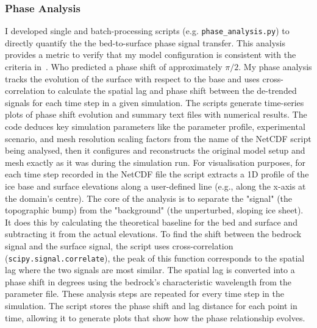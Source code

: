 \subsubsection{Phase Analysis}
I developed single and batch-processing scripts (e.g. \texttt{phase\_analysis.py}) to directly quantify the the bed-to-surface phase signal transfer. This analysis provides a metric to verify that my model configuration is consistent with the criteria in~\cite{Budd_1970}. Who predicted a phase shift of approximately $\pi / 2$. 
My phase analysis tracks the evolution of the surface with respect to the base and uses cross-correlation to calculate the spatial lag and phase shift between the de-trended signals for each time step in a given simulation.
The scripts generate time-series plots of phase shift evolution and summary text files with numerical results. The code deduces key simulation parameters like the parameter profile, experimental scenario, and mesh resolution scaling factors from the name of the NetCDF script being analysed, then it configures and reconstructs the original model setup and mesh exactly as it was during the simulation run. For visualisation purposes, for each time step recorded in the NetCDF file the script extracts a 1D profile of the ice base and surface elevations along a user-defined line (e.g., along the x-axis at the domain's centre). The core of the analysis is to separate the "signal" (the topographic bump) from the "background" (the unperturbed, sloping ice sheet). It does this by calculating the theoretical baseline for the bed and surface and subtracting it from the actual elevations. To find the shift between the bedrock signal and the surface signal, the script uses cross-correlation (\texttt{scipy.signal.correlate}), the peak of this function corresponds to the spatial lag where the two signals are most similar.
The spatial lag is converted into a phase shift in degrees using the bedrock's characteristic wavelength from the parameter file. These analysis steps are repeated for every time step in the simulation. The script stores the phase shift and lag distance for each point in time, allowing it to generate plots that show how the phase relationship evolves.
